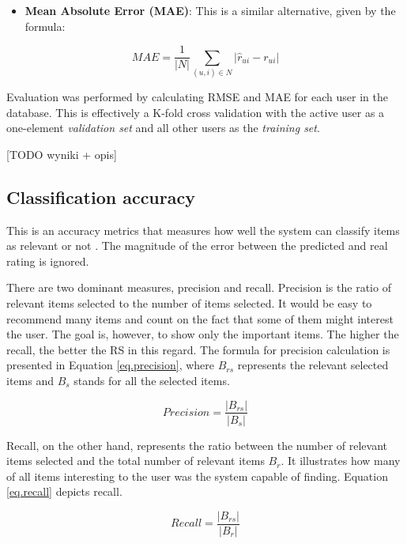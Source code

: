 \documentclass[12pt]{report}
\begin{document}
\begin{itemize}
\item {\bf Mean Absolute Error (MAE)}: This is a similar alternative, given by the formula:
\end{itemize}

\begin{equation}
MAE = \frac{1}{|N|} \displaystyle\sum_{(u,i) \in N} |\hat{r}_{ui} - r_{ui}|
\label{eq.mae}
\end{equation}
\hbox{}

Evaluation was performed by calculating RMSE and MAE for each user in the database. This is effectively a K-fold cross validation with the active user as a one-element \textit{validation set} and all other users as the \textit{training set}.

[TODO wyniki + opis]

\subsection{Classification accuracy}

This is an accuracy metrics that measures how well the system can classify items as relevant or not \cite{eval_twente}. The magnitude of the error between the predicted and real rating is ignored.

There are two dominant measures, precision and recall. Precision is the ratio of relevant items selected to the number of items selected. It would be easy to recommend many items and count on the fact that some of them might interest the user. The goal is, however, to show only the important items. The higher the recall, the better the RS in this regard. The formula for precision calculation is presented in Equation \ref{eq.precision}, where $B_{rs}$ represents the relevant selected items and $B_s$ stands for all the selected items.

\begin{equation}
Precision = \frac{|B_{rs}|}{|B_{s}|}
\label{eq.precision}
\end{equation}
\hbox{}

Recall, on the other hand, represents the ratio between the number of relevant items selected and the total number of relevant items $B_r$. It illustrates how many of all items interesting to the user was the system capable of finding. Equation \ref{eq.recall} depicts recall.

\begin{equation}
Recall = \frac{|B_{rs}|}{|B_{r}|}
\label{eq.recall}
\end{equation}
\hbox{}
\end{document}
